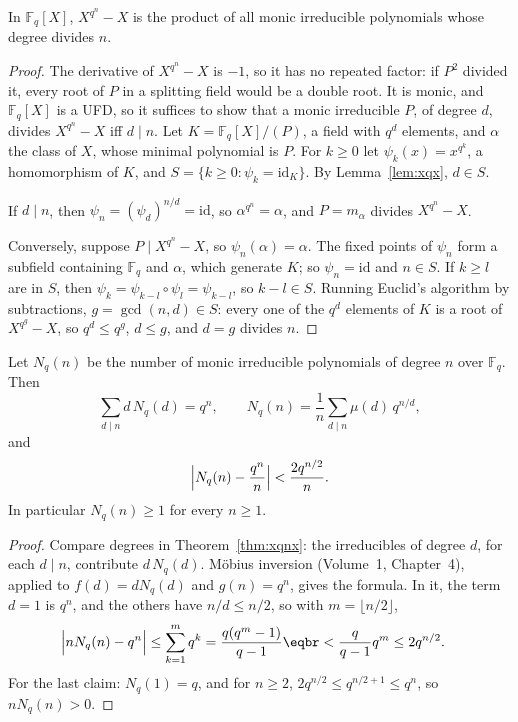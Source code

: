 \begin{theorem}\label{thm:xqnx}
In $\mathbb F_q[X]$, $X^{q^n}-X$ is the product of all monic irreducible polynomials whose degree divides $n$.
\end{theorem}
\begin{proof}
The derivative of $X^{q^n}-X$ is $-1$, so it has no repeated factor: if $P^2$ divided it, every root of $P$ in a splitting field would be a double root. It is monic, and $\mathbb F_q[X]$ is a UFD, so it suffices to show that a monic irreducible $P$, of degree $d$, divides $X^{q^n}-X$ iff $d\mid n$. Let $K=\mathbb F_q[X]/(P)$, a field with $q^d$ elements, and $\alpha$ the class of $X$, whose minimal polynomial is $P$. For $k\ge0$ let $\psi_k(x)=x^{q^k}$, a homomorphism of $K$, and $S=\{k\ge0:\psi_k=\mathrm{id}_K\}$. By Lemma~\ref{lem:xqx}, $d\in S$.

If $d\mid n$, then $\psi_n=(\psi_d)^{n/d}=\mathrm{id}$, so $\alpha^{q^n}=\alpha$, and $P=m_\alpha$ divides $X^{q^n}-X$.

Conversely, suppose $P\mid X^{q^n}-X$, so $\psi_n(\alpha)=\alpha$. The fixed points of $\psi_n$ form a subfield containing $\mathbb F_q$ and $\alpha$, which generate $K$; so $\psi_n=\mathrm{id}$ and $n\in S$. If $k\ge l$ are in $S$, then $\psi_k=\psi_{k-l}\circ\psi_l=\psi_{k-l}$, so $k-l\in S$. Running Euclid's algorithm by subtractions, $g=\gcd(n,d)\in S$: every one of the $q^d$ elements of $K$ is a root of $X^{q^g}-X$, so $q^d\le q^g$, $d\le g$, and $d=g$ divides $n$.
\end{proof}

\begin{theorem}[Gauss]\label{thm:countirr}
Let $N_q(n)$ be the number of monic irreducible polynomials of degree $n$ over $\mathbb F_q$. Then
\[
\sum_{d\mid n}d\,N_q(d)=q^n,\qquad N_q(n)=\frac1n\sum_{d\mid n}\mu(d)\,q^{n/d},
\]
and
\[
\Bigl|N_q(n)-\frac{q^n}n\Bigr|<\frac{2q^{n/2}}n.
\]
In particular $N_q(n)\ge1$ for every $n\ge1$.
\end{theorem}
\begin{proof}
Compare degrees in Theorem~\ref{thm:xqnx}: the irreducibles of degree $d$, for each $d\mid n$, contribute $d\,N_q(d)$. Möbius inversion (Volume~1, Chapter~4), applied to $f(d)=dN_q(d)$ and $g(n)=q^n$, gives the formula. In it, the term $d=1$ is $q^n$, and the others have $n/d\le n/2$, so with $m=\lfloor n/2\rfloor$,
\[
\begin{aligned}\Bigl|nN_q(n)-q^n\Bigr|&\le\sum_{k=1}^mq^k=\frac{q(q^m-1)}{q-1}\eqbr<\frac q{q-1}q^m\le2q^{n/2}.\end{aligned}
\]
For the last claim: $N_q(1)=q$, and for $n\ge2$, $2q^{n/2}\le q^{n/2+1}\le q^n$, so $nN_q(n)>0$.
\end{proof}

